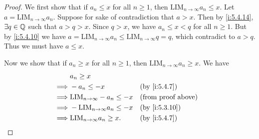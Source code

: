 \begin{proof}
  We first show that if \(a_n \leq x\) for all \(n \geq 1\), then \(\text{LIM}_{n \to \infty} a_n \leq x\).
  Let \(a = \text{LIM}_{n \to \infty} a_n\).
  Suppose for sake of contradiction that \(a > x\).
  Then by \cref{i:5.4.14}, \(\exists q \in \mathbb{Q}\) such that \(a > q > x\).
  Since \(q > x\), we have \(a_n \leq x < q\) for all \(n \geq 1\).
  But by \cref{i:5.4.10} we have \(a = \text{LIM}_{n \to \infty} a_n \leq \text{LIM}_{n \to \infty} q = q\), which contradict to \(a > q\).
  Thus we must have \(a \leq x\).

  Now we show that if \(a_n \geq x\) for all \(n \geq 1\), then \(\text{LIM}_{n \to \infty} a_n \geq x\).
  We have
  \begin{align*}
             & a_n \geq x                                                            \\
    \implies & -a_n \leq -x                           &  & \by{i:5.4.7}              \\
    \implies & \text{LIM}_{n \to \infty} -a_n \leq -x &  & \text{(from proof above)} \\
    \implies & -\text{LIM}_{n \to \infty} a_n \leq -x &  & \by{i:5.3.10}             \\
    \implies & \text{LIM}_{n \to \infty} a_n \geq x.  &  & \by{i:5.4.7}
  \end{align*}
\end{proof}

